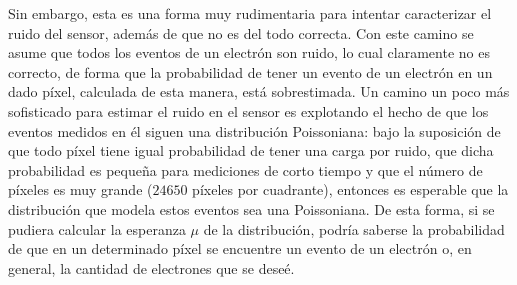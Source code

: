 \indent Sin embargo, esta es una forma muy rudimentaria para intentar caracterizar el ruido del sensor, además de que no es del todo correcta. Con este camino se asume que todos los eventos de un electrón son ruido, lo cual claramente no es correcto, de forma que la probabilidad de tener un evento de un electrón en un dado píxel, calculada de esta manera, está sobrestimada. Un camino un poco más sofisticado para estimar el ruido en el sensor es explotando el hecho de que los eventos medidos en él siguen una distribución Poissoniana: bajo la suposición de que todo píxel tiene igual probabilidad de tener una carga por ruido, que dicha probabilidad es pequeña para mediciones de corto tiempo y que el número de píxeles es muy grande ($24650$ píxeles por cuadrante), entonces es esperable que la distribución que modela estos eventos sea una Poissoniana. De esta forma, si se pudiera calcular la esperanza $\mu$ de la distribución, podría saberse la probabilidad de que en un determinado píxel se encuentre un evento de un electrón o, en general, la cantidad de electrones que se deseé.\\

